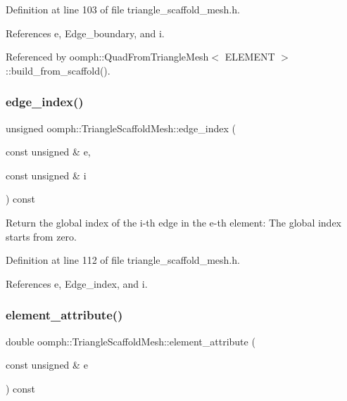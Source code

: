 Definition at line 103 of file triangle\+\_\+scaffold\+\_\+mesh.\+h.



References e, Edge\+\_\+boundary, and i.



Referenced by oomph\+::\+Quad\+From\+Triangle\+Mesh$<$ E\+L\+E\+M\+E\+N\+T $>$\+::build\+\_\+from\+\_\+scaffold().

\mbox{\label{classoomph_1_1TriangleScaffoldMesh_a39096c5bdd930e2f96efb0c74f70a27e}} 
\subsubsection{\texorpdfstring{edge\+\_\+index()}{edge\_index()}}
{\footnotesize\ttfamily unsigned oomph\+::\+Triangle\+Scaffold\+Mesh\+::edge\+\_\+index (\begin{DoxyParamCaption}\item[{const unsigned \&}]{e,  }\item[{const unsigned \&}]{i }\end{DoxyParamCaption}) const\hspace{0.3cm}{\ttfamily [inline]}}



Return the global index of the i-\/th edge in the e-\/th element\+: The global index starts from zero. 



Definition at line 112 of file triangle\+\_\+scaffold\+\_\+mesh.\+h.



References e, Edge\+\_\+index, and i.

\mbox{\label{classoomph_1_1TriangleScaffoldMesh_aa1727c3ffd9de83c8c4c8cc41f52f212}} 
\subsubsection{\texorpdfstring{element\+\_\+attribute()}{element\_attribute()}}
{\footnotesize\ttfamily double oomph\+::\+Triangle\+Scaffold\+Mesh\+::element\+\_\+attribute (\begin{DoxyParamCaption}\item[{const unsigned \&}]{e }\end{DoxyParamCaption}) const\hspace{0.3cm}{\ttfamily [inline]}}



